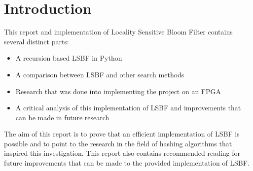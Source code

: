 \chapter{Introduction}

This report and implementation of Locality Sensitive Bloom Filter contains several distinct parts:

\begin{itemize}
	\item A recursion based LSBF in Python
	\item A comparison between LSBF and other search methods
	\item Research that was done into implementing the project on an FPGA
	\item A critical analysis of this implementation of LSBF and improvements that can be made in future research
\end{itemize}

The aim of this report is to prove that an efficient implementation of LSBF is possible and to point to the research in the field of hashing algorithms that inspired this investigation. This report also contains recommended reading for future improvements that can be made to the provided implementation of LSBF.
